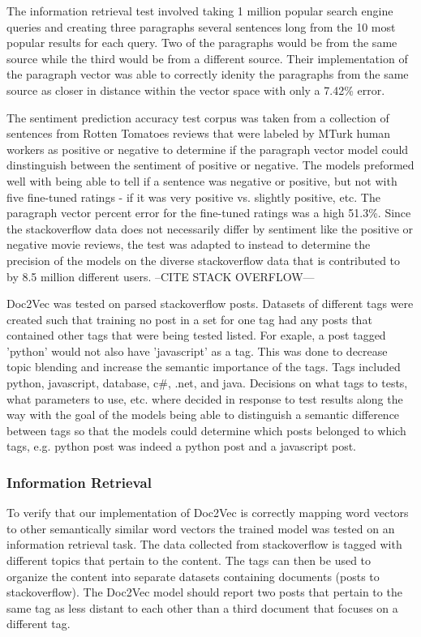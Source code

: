 The information retrieval test involved taking 1 million popular search engine queries and creating three paragraphs several sentences long from the 10 most popular results for each query. Two of the paragraphs would be from the same source while the third would be from a different source. Their implementation of the paragraph vector was able to correctly idenity the paragraphs from the same source as closer in distance within the vector space with only a 7.42\% error. 

The sentiment prediction accuracy test corpus was taken from a collection of sentences from Rotten Tomatoes reviews that were labeled by MTurk human workers as positive or negative to determine if the paragraph vector model could dinstinguish between the sentiment of positive or negative. The models preformed well with being able to tell if a sentence was negative or positive, but not with five fine-tuned ratings - if it was very positive vs. slightly positive, etc. The paragraph vector percent error for the fine-tuned ratings was a high 51.3\%. Since the stackoverflow data does not necessarily differ by sentiment like the positive or negative movie reviews, the test was adapted to instead to determine the precision of the models on the diverse stackoverflow data that is contributed to by 8.5 million different users. --CITE STACK OVERFLOW---

Doc2Vec was tested on parsed stackoverflow posts. Datasets of different tags were created such that training no post in a set for one tag had any posts that contained other tags that were being tested listed. For exaple, a post tagged 'python' would not also have 'javascript' as a tag. This was done to decrease topic blending and increase the semantic importance of the tags. Tags included python, javascript, database, c\#, .net, and java. Decisions on what tags to tests, what parameters to use, etc. where decided in response to test results along the way with the goal of the models being able to distinguish a semantic difference between tags so that the models could determine which posts belonged to which tags, e.g. python post was indeed a python post and a javascript post.

\subsubsection{Information Retrieval}

To verify that our implementation of Doc2Vec is correctly mapping word vectors to other semantically similar word vectors the trained model was tested on an information retrieval task. The data collected from stackoverflow is tagged with different topics that pertain to the content. The tags can then be used to organize the content into separate datasets containing documents (posts to stackoverflow). The Doc2Vec model should report two posts that pertain to the same tag as less distant to each other than a third document that focuses on a different tag.

